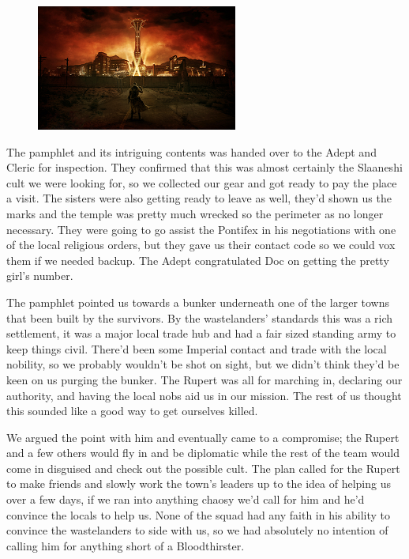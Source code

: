 \begin{figure}
	\begin{center}
		\includegraphics[width=\figwidth]{pics/6/13.png}
	\end{center}
\end{figure}
The pamphlet and its intriguing contents was handed over to the Adept and Cleric for inspection. 
They confirmed that this was almost certainly the Slaaneshi cult we were looking for, so we collected our gear and got ready to pay the place a visit. 
The sisters were also getting ready to leave as well, they'd shown us the marks and the temple was pretty much wrecked so the perimeter as no longer necessary. 
They were going to go assist the Pontifex in his negotiations with one of the local religious orders, but they gave us their contact code so we could vox them if we needed backup. 
The Adept congratulated Doc on getting the pretty girl's number.

The pamphlet pointed us towards a bunker underneath one of the larger towns that been built by the survivors. 
By the wastelanders' standards this was a rich settlement, it was a major local trade hub and had a fair sized standing army to keep things civil. 
There'd been some Imperial contact and trade with the local nobility, so we probably wouldn't be shot on sight, but we didn't think they'd be keen on us purging the bunker. 
The Rupert was all for marching in, declaring our authority, and having the local nobs aid us in our mission. 
The rest of us thought this sounded like a good way to get ourselves killed.

We argued the point with him and eventually came to a compromise; the Rupert and a few others would fly in and be diplomatic while the rest of the team would come in disguised and check out the possible cult. 
The plan called for the Rupert to make friends and slowly work the town's leaders up to the idea of helping us over a few days, if we ran into anything chaosy we'd call for him and he'd convince the locals to help us. 
None of the squad had any faith in his ability to convince the wastelanders to side with us, so we had absolutely no intention of calling him for anything short of a Bloodthirster.

